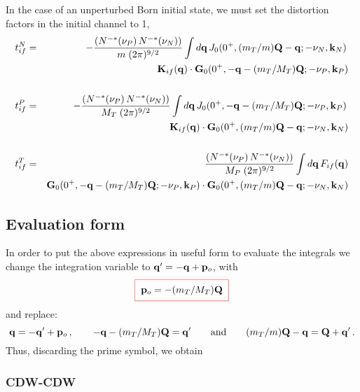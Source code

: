 In the case of an unperturbed Born initial state, we must set the
distortion factors in the initial channel to 1,
\begin{eqnarray}\label{Q:tn_if-born}
t^{N}_{if}&=& -\frac{\left(N^{-*}(\nu_{P}) \,N^{-*}(\nu_{N}) \right)}{m
\; (2 \pi)^{9/2}} \int d \mathbf{q} \, J_{0}(0^{+}, (m_{T}/m)\mathbf{Q} -
\mathbf{q}; -\nu_{N}, \mathbf{k}_{N} ) \,
  \\
&& \mathbf{K}_{if}(\mathbf{q}) \cdot \mathbf{G}_{0}( 0^{+} ,
-\mathbf{q}-(m_{T}/M_{T})\mathbf{Q};-\nu_{P},\mathbf{k}_{P}) \nonumber
  \\
\nonumber \\
t^{P}_{if}&=& -\frac{\left(N^{-*}(\nu_{P}) \,N^{-*}(\nu_{N})
\right)}{M_{T} \; (2 \pi)^{9/2}} \int d \mathbf{q} \, J_{0}( 0^{+} ,
-\mathbf{q}-(m_{T}/M_{T})\mathbf{Q};-\nu_{P},\mathbf{k}_{P})  \,
  \\
&& \mathbf{K}_{if}(\mathbf{q}) \cdot \mathbf{G}_{0}(0^{+}, (m_{T}/m)\mathbf{Q} -
\mathbf{q}; -\nu_{N}, \mathbf{k}_{N} )\nonumber
  \\
\nonumber \\
t^{T}_{if}&=& \frac{\left(N^{-*}(\nu_{P}) \,N^{-*}(\nu_{N})
\right)}{M_{P} \; (2 \pi)^{9/2}} \int d \mathbf{q} \,   F_{if}(\mathbf{q})
  \\
&&  \mathbf{G}_{0}( 0^{+} ,
-\mathbf{q}-(m_{T}/M_{T})\mathbf{Q};-\nu_{P},\mathbf{k}_{P})\cdot \mathbf{G}_{0}(0^{+},
(m_{T}/m)\mathbf{Q} - \mathbf{q}; -\nu_{N}, \mathbf{k}_{N} )\nonumber
\end{eqnarray}

\subsection{Evaluation form}

In order to put the above expressions in useful form to evaluate the
integrals we change the integration variable to $\mathbf{q}' =
-\mathbf{q}+\mathbf{p}_{o}$, with
\[
\fbeq{ \vect{p}_{o}=-(m_{T}/M_{T})\vect{Q}}
\]
  and replace:
\[
  \mathbf{q}= - \mathbf{q}' + \mathbf{p}_{o}\, , \qquad
  -\mathbf{q}-(m_{T}/M_{T})\mathbf{Q}=\mathbf{q}' \qquad \mbox{and} \qquad
  (m_{T}/m)\mathbf{Q}-\mathbf{q}=\mathbf{Q}+\mathbf{q}' \,.
\]
%
Thus, discarding the prime symbol, we obtain
%
\subsubsection{CDW-CDW}

